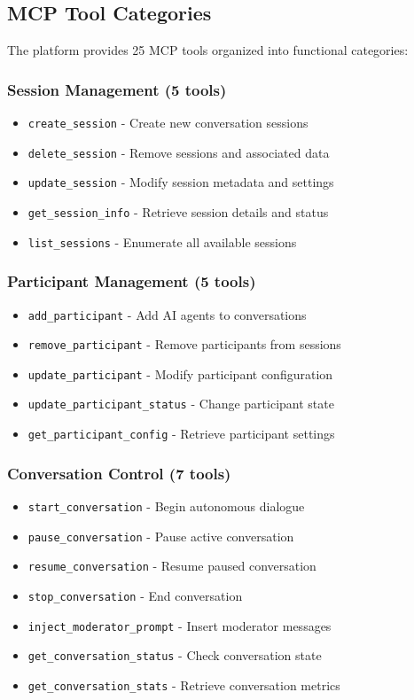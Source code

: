 \documentclass[11pt,letterpaper]{article}
\begin{document}
\subsection{MCP Tool Categories}

The platform provides 25 MCP tools organized into functional categories:

\subsubsection{Session Management (5 tools)}
\begin{itemize}
    \item \texttt{create\_session} - Create new conversation sessions
    \item \texttt{delete\_session} - Remove sessions and associated data
    \item \texttt{update\_session} - Modify session metadata and settings
    \item \texttt{get\_session\_info} - Retrieve session details and status
    \item \texttt{list\_sessions} - Enumerate all available sessions
\end{itemize}

\subsubsection{Participant Management (5 tools)}
\begin{itemize}
    \item \texttt{add\_participant} - Add AI agents to conversations
    \item \texttt{remove\_participant} - Remove participants from sessions
    \item \texttt{update\_participant} - Modify participant configuration
    \item \texttt{update\_participant\_status} - Change participant state
    \item \texttt{get\_participant\_config} - Retrieve participant settings
\end{itemize}

\subsubsection{Conversation Control (7 tools)}
\begin{itemize}
    \item \texttt{start\_conversation} - Begin autonomous dialogue
    \item \texttt{pause\_conversation} - Pause active conversation
    \item \texttt{resume\_conversation} - Resume paused conversation
    \item \texttt{stop\_conversation} - End conversation
    \item \texttt{inject\_moderator\_prompt} - Insert moderator messages
    \item \texttt{get\_conversation\_status} - Check conversation state
    \item \texttt{get\_conversation\_stats} - Retrieve conversation metrics
\end{itemize}
\end{document}
